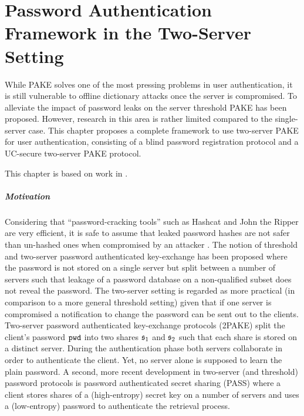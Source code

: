 \chapter{Password Authentication Framework in the Two-Server Setting} \label{ch:2pake}

While \ac{PAKE} solves one of the most pressing problems in user authentication, it is still vulnerable to offline dictionary attacks once the server is compromised.
To alleviate the impact of password leaks on the server threshold \ac{PAKE} has been proposed.
However, research in this area is rather limited compared to the single-server case.
This chapter proposes a complete framework to use two-server \ac{PAKE} for user authentication, consisting of a blind password registration protocol and a \ac{UC}-secure two-server \ac{PAKE} protocol.

This chapter is based on work in \cite{KieferM14b,KieferM15b,KieferM15c}.

\paragraph{Motivation}

Considering that ``password-cracking tools'' such as Hashcat \cite{hashcat} and John the Ripper \cite{JohnTheRipper} are very efficient, it is safe to assume that leaked password hashes are not safer than un-hashed ones when compromised by an attacker \cite{NarayananS05a,WeirAMG09,DellAmicoMR10,Bonneau12}.
The notion of threshold and two-server password authenticated key-exchange \cite{FordK00,MacKenzieSJ02} has been proposed where the password is not stored on a single server but split between a number of servers such that leakage of a password database on a non-qualified subset does not reveal the password.
The two-server setting is regarded as more practical (in comparison to a more general threshold setting) given that if one server is compromised a notification to change the password can be sent out to the clients.
Two-server password authenticated key-exchange protocols (2PAKE) \cite{Brainard2003,SzydloK05,Katz2005} split the client's password $\mathtt{pwd}$ into two shares $\mathfrak{s}_1$ and $\mathfrak{s}_2$ such that each share is stored on a distinct server.
During the authentication phase both servers collaborate in order to authenticate the client.
Yet, no server alone is supposed to learn the plain password.
A second, more recent development in two-server (and threshold) password protocols is password authenticated secret sharing (PASS) \cite{Bagherzandi2011,CamenischLN2012,JareckiKK14} where a client stores shares of a (high-entropy) secret key on a number of servers and uses a (low-entropy) password to authenticate the retrieval process.

